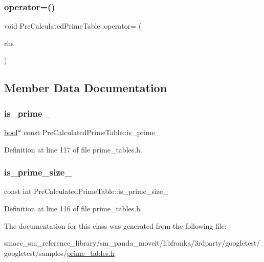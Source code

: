 \subsubsection{\texorpdfstring{operator=()}{operator=()}}
{\footnotesize\ttfamily void Pre\+Calculated\+Prime\+Table\+::operator= (\begin{DoxyParamCaption}\item[{const \hyperlink{classPreCalculatedPrimeTable}{Pre\+Calculated\+Prime\+Table} \&}]{rhs }\end{DoxyParamCaption})\hspace{0.3cm}{\ttfamily [private]}}



\subsection{Member Data Documentation}
\mbox{\label{classPreCalculatedPrimeTable_ac393ebf41a32b3cba39fe67f7aa5fa38}} 
\subsubsection{\texorpdfstring{is\+\_\+prime\+\_\+}{is\_prime\_}}
{\footnotesize\ttfamily \hyperlink{classbool}{bool}$\ast$ const Pre\+Calculated\+Prime\+Table\+::is\+\_\+prime\+\_\+\hspace{0.3cm}{\ttfamily [private]}}



Definition at line 117 of file prime\+\_\+tables.\+h.

\mbox{\label{classPreCalculatedPrimeTable_ad4275df41c5e5be3cad8c5abeaad1ac6}} 
\subsubsection{\texorpdfstring{is\+\_\+prime\+\_\+size\+\_\+}{is\_prime\_size\_}}
{\footnotesize\ttfamily const int Pre\+Calculated\+Prime\+Table\+::is\+\_\+prime\+\_\+size\+\_\+\hspace{0.3cm}{\ttfamily [private]}}



Definition at line 116 of file prime\+\_\+tables.\+h.



The documentation for this class was generated from the following file\+:\begin{DoxyCompactItemize}
\item 
smacc\+\_\+sm\+\_\+reference\+\_\+library/sm\+\_\+panda\+\_\+moveit/libfranka/3rdparty/googletest/googletest/samples/\hyperlink{prime__tables_8h}{prime\+\_\+tables.\+h}\end{DoxyCompactItemize}
